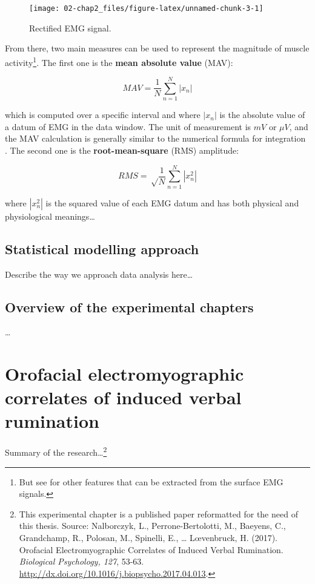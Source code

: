 \documentclass[a4paper,11pt,oneside,oldfontcommands]{memoir}
\let\rmarkdownfootnote\footnote%
\def\footnote{\protect\rmarkdownfootnote}
\begin{document}
\begin{figure}[H]

{\centering \texttt{[image: 02-chap2\_files/figure-latex/unnamed-chunk-3-1]} 

}

\caption{Rectified EMG signal.}\label{fig:unnamed-chunk-3}
\end{figure}

From there, two main measures can be used to represent the magnitude of
muscle activity\footnote{But see \citet{phinyomark_feature_2012} for
  other features that can be extracted from the surface EMG signals.}.
The first one is the \textbf{mean absolute value} (MAV):

\[MAV = \frac{1}{N} \sum_{n=1}^{N} | x_{n} |\]

which is computed over a specific interval and where \(|x_{n}|\) is the
absolute value of a datum of EMG in the data window. The unit of
measurement is \(mV\) or \(\mu V\), and the MAV calculation is generally
similar to the numerical formula for integration
\citep{kamen_essentials_2010}. The second one is the
\textbf{root-mean-square} (RMS) amplitude:

\[RMS = \sqrt \frac{1}{N} \sum_{n=1}^{N} | x^{2}_{n} |\]

where \(| x^{2}_{n} |\) is the squared value of each EMG datum and has
both physical and physiological meanings\ldots{}

\section{Statistical modelling
approach}\label{statistical-modelling-approach}

Describe the way we approach data analysis here\ldots{}

\section{Overview of the experimental
chapters}\label{overview-of-the-experimental-chapters}

\ldots{}

\chapter{Orofacial electromyographic correlates of induced verbal
rumination}\label{orofacial-electromyographic-correlates-of-induced-verbal-rumination}

Summary of the research\ldots{}\footnote{This experimental chapter is a
  published paper reformatted for the need of this thesis. Source:
  Nalborczyk, L., Perrone-Bertolotti, M., Baeyens, C., Grandchamp, R.,
  Polosan, M., Spinelli, E., \ldots{} L\oe venbruck, H. (2017).
  Orofacial Electromyographic Correlates of Induced Verbal Rumination.
  \emph{Biological Psychology, 127}, 53-63.
  \url{http://dx.doi.org/10.1016/j.biopsycho.2017.04.013}.}
\end{document}
